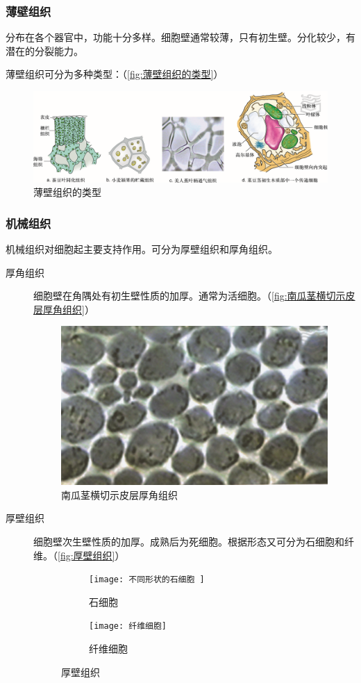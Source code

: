 	\subsubsection{薄壁组织}
	
	分布在各个器官中，功能十分多样。细胞壁通常较薄，只有初生壁。分化较少，有潜在的分裂能力。
	
	薄壁组织可分为多种类型：（\autoref{fig:薄壁组织的类型}）
	
	\begin{figure}[htbp]
		\centering
		\includegraphics[width=\linewidth]{Pics/薄壁组织的类型}
		\caption{薄壁组织的类型}
		\label{fig:薄壁组织的类型}
	\end{figure}
	
	\subsubsection{机械组织}
	
	机械组织对细胞起主要支持作用。可分为厚壁组织和厚角组织。
	
	\begin{description}
		\item[厚角组织] 细胞壁在角隅处有初生壁性质的加厚。通常为活细胞。（\autoref{fig:南瓜茎横切示皮层厚角组织}）
		
		\begin{figure}[htbp]
			\centering
			\includegraphics[width=0.5\linewidth]{Pics/南瓜茎横切示皮层厚角组织}
			\caption{南瓜茎横切示皮层厚角组织}
			\label{fig:南瓜茎横切示皮层厚角组织}
		\end{figure}
		
		\item[厚壁组织] 细胞壁次生壁性质的加厚。成熟后为死细胞。根据形态又可分为石细胞和纤维。（\autoref{fig:厚壁组织}）
		
		\begin{figure}[htbp]
			\centering
			\begin{subfigure}{0.45\textwidth}
				\texttt{[image: 不同形状的石细胞
				]}
				\caption{石细胞}
			\end{subfigure}
			\hfill
			\begin{subfigure}{0.45\textwidth}
				\texttt{[image: 纤维细胞]}
				\caption{纤维细胞}
			\end{subfigure}
			\caption{厚壁组织}
			\label{fig:厚壁组织}
		\end{figure}
	\end{description}
	
